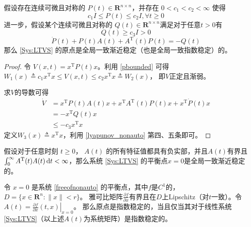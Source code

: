 \begin{corollary}
  假设存在连续可微且对称的 $P (t) \in \mathbf{R}^{n \times n}$，并存在 $0 < c_1 < c_2 < \infty$
  使得
  \begin{equation}\label{pbounded}
    c_1 I \leq P (t) \leq c_2 I, \forall t \geq 0
  \end{equation}
  进一步，假设某个连续可微且对称的 $Q (t) \in \mathbf{R}^{n \times n}$满足对于任意$t>0$有
  \[ Q (t) \geq c_3 I > 0 \]
  \[ \dot{P} (t) + P (t) A (t) + A^\mathrm{T} (t) P (t) = - Q (t) \]
  那么 \eqref{Sys:LTVS} 的原点是全局一致渐近稳定（也是全局一致指数稳定）的。
\end{corollary}
\begin{proof}
    令 $V (x, t) = x^\mathrm{T} P (t) x$。利用 \eqref{pbounded} 可得
  $W_1 (x) \triangleq c_1 x^\mathrm{T} x \leq V (x, t) \leq c_2 x^\mathrm{T} x \triangleq W_2 (x)$，
  即$V$正定且渐弱。
  
  求$V$的导数可得
  \begin{align*}
    \dot{V} & =  x^\mathrm{T} P (t) A (t) x + x^\mathrm{T} A^\mathrm{T} (t) P (t) x + x^\mathrm{T} \dot{P} (t) x\\
    & =  - x^\mathrm{T} Q (t) x\\
    & \leq  - c_3 x^\mathrm{T} x
  \end{align*}
  定义$W_3 (x)\triangleq x^\mathrm{T} x $，利用 \ref{lyapunov_nonauto} 第四、五条即可。
\end{proof}

\begin{corollary}
  假设对于任意时刻 $t \geq 0$， $A (t)$ 的所有特征值都具有负实部，并且$A (t)$有界且 $\int^{\infty}_0
  A^\mathrm{T} (t) A (t) \mathop{}\!\mathrm{d}  t < \infty$，那么系统 \eqref{Sys:LTVS} 的平衡点$x=0$是全局一致渐近稳定的。
\end{corollary}
\begin{theorem}[利用线性化判别非自治系统的稳定性]
    令 $x = 0$ 是系统 \eqref{freeofnonauto} 的平衡点，其中$f$是$C^1$的，$D=\{x\in \mathbf{R}^n:\|x\|<r\}$。
    雅可比矩阵$\frac{\partial f}{\partial x}$有界且在$D$上Lipschitz（对$t$一致）。令$A(t)=\left.\frac{\partial f}{\partial x}(t,x)\right|_{x=0}$。
    那么原点是指数稳定的，当且仅当其对于线性系统 \eqref{Sys:LTVS}（以上述$A(t)$为系统矩阵）是指数稳定的。
\end{theorem}